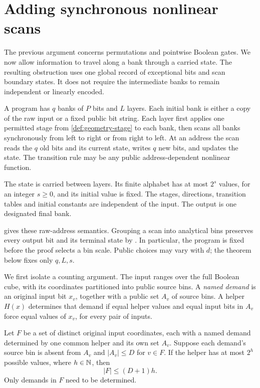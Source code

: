 \section{Adding synchronous nonlinear scans}
\label{sec:scans}

The previous argument concerns permutations and pointwise Boolean gates.
We now allow information to travel along a bank through a carried state.
The resulting obstruction uses one global record of exceptional bits
and scan boundary states. It does not require the intermediate banks to
remain independent or linearly encoded.

\begin{definition}
\label{def:scan-program}
A program has $q$ banks of $P$ bits and $L$ layers. Each initial bank is
either a copy of the raw input or a fixed public bit string. Each layer
first applies one permitted stage from \cref{def:geometry-stage} to each
bank, then scans all banks synchronously from left to right or from
right to left. At an address the scan reads the $q$ old bits and its
current state, writes $q$ new bits, and updates the state. The transition
rule may be any public address-dependent nonlinear function.

The state is carried between layers. Its finite alphabet has at most
$2^s$ values, for an integer $s\geq0$, and its initial value is fixed.
The stages, directions, transition tables and initial constants are
independent of the input. The output is one designated final bank.
\end{definition}

 gives these raw-address semantics. Grouping a scan
into analytical bins preserves every output bit and its terminal state
by . In particular, the program is fixed
before the proof selects a bin scale. Public choices may vary with $d$;
the theorem below fixes only $q,L,s$.

We first isolate a counting argument. The input ranges over the full
Boolean cube, with its coordinates partitioned into public source bins.
A \emph{named demand} is an original input bit $x_v$, together with a
public set $A_v$ of source bins. A helper $H(x)$ determines that demand
if equal helper values and equal input bits in $A_v$ force equal values
of $x_v$, for every pair of inputs.

\begin{lemma}
\label{lem:named-helper}
Let $F$ be a set of distinct original input coordinates, each with a
named demand determined by one common helper and its own set $A_v$. Suppose each demand's source bin is absent from
$A_v$ and $|A_v|\leq D$ for $v\in F$. If the helper has at most $2^h$
possible values, where $h\in\mathbb N$, then
\begin{equation}
 \label{eq:named-helper}
                       |F|\leq (D+1)h.
\end{equation}
Only demands in $F$ need to be determined.
\end{lemma}

